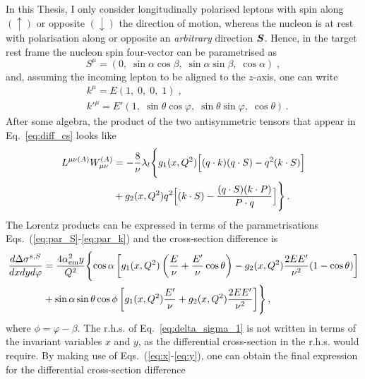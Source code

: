 In this Thesis, I only consider longitudinally polarised leptons with spin along $(\uparrow)$ or opposite $(\downarrow)$ the direction of motion, whereas the nucleon is at rest with polarisation along or opposite an \textit{arbitrary} direction $\vb*{S}$. Hence, in the target rest frame the nucleon spin four-vector can be parametrised as
\begin{equation}
  S^{\mu} = (0, \; \sin \alpha \cos\beta, \; \sin \alpha \sin \beta, \; \cos \alpha) \;,
  \label{eq:par_S}
\end{equation}
and, assuming the incoming lepton to be aligned to the $z$-axis, one can write
\begin{equation}
  \begin{split}
    & k^{\mu} = E (1,\; 0,\; 0,\; 1)\;, \\
    & k'^{\mu} = E'( 1,\; \sin\theta \cos \varphi,\; \sin\theta \sin \varphi, \; \cos \theta )\,.
    \label{eq:par_k}
  \end{split}
\end{equation} 
After some algebra, the product of the two antisymmetric tensors that appear in Eq.~\eqref{eq:diff_cs} looks like 
\begin{equation}
  \begin{split}
    L^{\mu \nu (A)} W_{\mu \nu}^{(A)} & = - \frac{8}{\nu} \lambda_{l} \Biggl\{ g_1(x,Q^2) \Bigl[ (q \cdot k)(q \cdot S) - q^2 (k \cdot S) \Bigr] \Biggr. \\
    & +  \Biggl. g_2 (x, Q^2) q^2\Bigl[ (k \cdot S) - \frac{(q \cdot S) (k \cdot P)}{P \cdot q} \Bigr] \Biggr\}\,.
  \end{split}
\end{equation}
The Lorentz products can be expressed in terms of the parametrisations Eqs.~(\ref{eq:par_S}-\ref{eq:par_k}) and the cross-section difference is
\begin{equation}
  \begin{split}
    \frac{d \Delta \sigma^{s,S}}{dx dy d\varphi} & = \frac{4 \alpha_{\textrm{em}}^2 y}{Q^2} \Biggl\{ \cos \alpha \left[ g_1(x,Q^2) \left( \frac{E}{\nu} + \frac{E'}{\nu} \cos \theta \right) - g_2(x,Q^2) \frac{2 E E'}{\nu^2} (1 - \cos \theta) \right] \Biggr. \\
    & + \Biggl. \sin\alpha \sin\theta \cos\phi \left[ g_1(x,Q^2) \frac{E'}{\nu} + g_2(x,Q^2) \frac{2EE'}{\nu^2} \right] \Biggr\}\,,
  \end{split}
  \label{eq:delta_sigma_1}
\end{equation}
where $\phi = \varphi - \beta$. The r.h.s. of Eq.~\eqref{eq:delta_sigma_1} is not written in terms of the invariant variables $x$ and $y$, as the differential cross-section in the r.h.s. would require. By making use of Eqs.~(\ref{eq:x}-\ref{eq:y}), one can obtain the final expression for the differential cross-section difference
